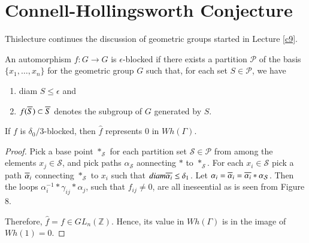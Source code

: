 \chapter{Connell-Hollingsworth Conjecture}\label{c10}

This\pageoriginale lecture continues the discussion of geometric
groups started in Lecture \ref{c9}. 

\begin{defi}\label{c10:defi10.1}
  An automorphism $f: G \to G$ is $\epsilon$-blocked if there exists a
  partition $\mathcal{P}$ of the basis $\{ x_1, \ldots , x_n\}$ for
  the geometric group $G$ such that, for each set $S \in
  \mathcal{P}$, we have
  \begin{enumerate}
    \item diam $S \leq \epsilon$ and
      \item $f (\overline{S}) \subset \overline{S}$ denotes
        the subgroup of $G$ generated by $S$.
  \end{enumerate}
\end{defi}

\begin{lemma}\label{c10:lem10.2}
  If $f$ is $\delta_0/3$-blocked, then $\hat{f}$ represents 0 in $Wh
  (\Gamma)$. 
\end{lemma}

\begin{proof}
  Pick a base point $*_\mathcal{S}$ for each partition set
  $\mathcal{S} \in \mathcal{P}$ from among the elements $x_j \in
  \mathcal{S}$, and pick paths $\alpha_{\mathcal{S}}$ aonnecting $*$
  to $*_{\mathcal{S}}$. For each $x_i \in \mathcal{S}$ pick a path
  $\overline{\alpha}_i$  connecting $*_{\mathcal{S}}$ to $x_i$ such that
  $diam \overline{\alpha_i} \leq \delta_1$. Let $\alpha_i = \overline{\alpha}_i =
  \overline{\alpha_i}* \alpha_{\mathcal{S}}$. Then the loops $\alpha_i^{-1}
  * \gamma_{ij}* \alpha_{j}$, such that $f_{ij} \neq 0$, are all
  ineseential as is seen from Figure 8.
  \begin{figure}[H]
  \end{figure}
  Therefore, $\hat{f} = f \in GL_n (\mathbb{Z})$. Hence, its value in
  $Wh(\Gamma)$ is in the image of $Wh (1) = 0$. 
\end{proof}

